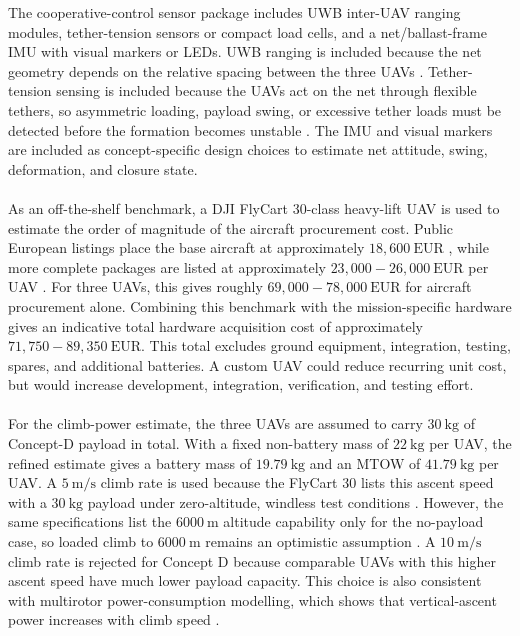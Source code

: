 The cooperative-control sensor package includes UWB inter-UAV ranging modules, tether-tension sensors or compact load cells, and a net/ballast-frame IMU with visual markers or LEDs. UWB ranging is included because the net geometry depends on the relative spacing between the three UAVs \cite{Shule2020UWB-BasedSurvey}. Tether-tension sensing is included because the UAVs act on the net through flexible tethers, so asymmetric loading, payload swing, or excessive tether loads must be detected before the formation becomes unstable \cite{Prkacin2025TrajectorySystems}. The IMU and visual markers are included as concept-specific design choices to estimate net attitude, swing, deformation, and closure state. \\ \\

As an off-the-shelf benchmark, a DJI FlyCart 30-class heavy-lift UAV is used to estimate the order of magnitude of the aircraft procurement cost. Public European listings place the base aircraft at approximately \(18{,}600~\mathrm{EUR}\) \cite{COPTERS.EU2026DJI30}, while more complete packages are listed at approximately \(23{,}000{-}26{,}000~\mathrm{EUR}\) per UAV \cite{DigitalAgro2026DJI30}. For three UAVs, this gives roughly \(69{,}000{-}78{,}000~\mathrm{EUR}\) for aircraft procurement alone. Combining this benchmark with the mission-specific hardware gives an indicative total hardware acquisition cost of approximately \(71{,}750{-}89{,}350~\mathrm{EUR}\). This total excludes ground equipment, integration, testing, spares, and additional batteries. A custom UAV could reduce recurring unit cost, but would increase development, integration, verification, and testing effort. \\ \\

For the climb-power estimate, the three UAVs are assumed to carry \(30~\mathrm{kg}\) of Concept-D payload in total. With a fixed non-battery mass of \(22~\mathrm{kg}\) per UAV, the refined estimate gives a battery mass of \(19.79~\mathrm{kg}\) and an MTOW of \(41.79~\mathrm{kg}\) per UAV. A \(5~\mathrm{m/s}\) climb rate is used because the FlyCart 30 lists this ascent speed with a \(30~\mathrm{kg}\) payload under zero-altitude, windless test conditions \cite{DJI2026DJISpecifications}. However, the same specifications list the \(6000~\mathrm{m}\) altitude capability only for the no-payload case, so loaded climb to \(6000~\mathrm{m}\) remains an optimistic assumption \cite{DJI2026DJISpecifications}. A \(10~\mathrm{m/s}\) climb rate is rejected for Concept D because comparable UAVs with this higher ascent speed have much lower payload capacity. This choice is also consistent with multirotor power-consumption modelling, which shows that vertical-ascent power increases with climb speed \cite{Gong2022ModellingUAVs}.


